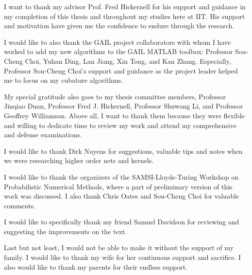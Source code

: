 \documentclass{iitthesis}          %
\begin{document}
\begin{acknowledgement}     %
	\par  I want to thank my advisor Prof. Fred Hickernell for his support and guidance in my completion of this thesis and throughout my studies here at IIT. 
	His support and motivation have given me the confidence to endure through the research. 
	
	I would like to also thank the GAIL project collaborators with
	whom I have worked to add my new algorithms to the GAIL MATLAB toolbox: Professor Sou-Cheng Choi,
	Yuhan Ding, Lan Jiang, Xin Tong, and Kan Zhang. Especially, Professor Sou-Cheng Choi's support and guidance as the project leader helped me to focus on my cubature algorithms.
	
	My special gratitude also goes to my thesis committee members, Professor Jinqiao Duan,
	Professor Fred J. Hickernell, Professor Shuwang Li, and Professor Geoffrey Williamson. Above all, I want to thank them because they were flexible and willing to dedicate time to review my work and attend my comprehensive and defense examinations.
	
	I would like to thank Dirk Nuyens for suggestions, valuable tips and notes when we were researching higher order nets and kernels.
	
	I would like to thank the organizers of the SAMSI-Lloyds-Turing Workshop on Probabilistic Numerical Methods, where a part of preliminary version of this work was discussed.  I also thank Chris Oates and Sou-Cheng Choi for valuable comments.
	
	I would like to specifically thank my friend Samuel Davidson for reviewing and suggesting the improvements on the text.
	
	Last but not least, I would not be able to make it without the support of my family. I would like to thank my wife for her continuous support and sacrifice. I also would like to thank my parents for their endless support.


	
\end{acknowledgement}

\tableofcontents
\end{document}
